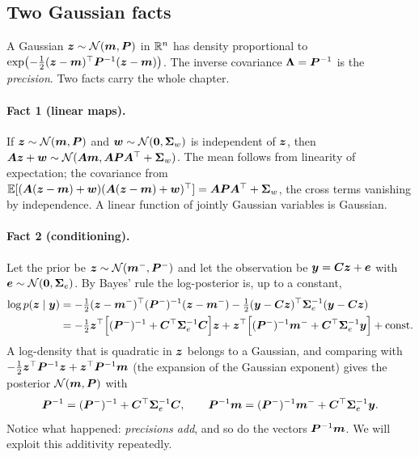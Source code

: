 \subsection{Two Gaussian facts}\label{sec:c08-gauss}

A Gaussian $\bm{z}\sim\mathcal{N}(\bm{m},\bm{P})$ in $\mathbb{R}^n$ has density proportional to
$\exp\bigl(-\tfrac12(\bm{z}-\bm{m})^{\top}\bm{P}^{-1}(\bm{z}-\bm{m})\bigr)$. The inverse covariance
$\bm{\Lambda}=\bm{P}^{-1}$ is the \emph{precision}. Two facts carry the whole chapter.

\paragraph{Fact 1 (linear maps).} If $\bm{z}\sim\mathcal{N}(\bm{m},\bm{P})$ and $\bm{w}\sim\mathcal{N}(\bm{0},
\bm{\Sigma}_w)$ is independent of $\bm{z}$, then $\bm{A}\bm{z}+\bm{w}\sim\mathcal{N}(\bm{A}\bm{m},\bm{A}\bm{P}\bm{A}^{\top}+\bm{\Sigma}_w)$.
The mean follows from linearity of expectation; the covariance from
$\mathbb{E}[(\bm{A}(\bm{z}-\bm{m})+\bm{w})(\bm{A}(\bm{z}-\bm{m})+\bm{w})^{\top}]=\bm{A}\bm{P}\bm{A}^{\top}+\bm{\Sigma}_w$, the cross terms vanishing by
independence. A linear function of jointly Gaussian variables is Gaussian.

\paragraph{Fact 2 (conditioning).} Let the prior be $\bm{z}\sim\mathcal{N}(\bm{m}^-,\bm{P}^-)$ and let the
observation be $\bm{y}=\bm{C}\bm{z}+\bm{e}$ with $\bm{e}\sim\mathcal{N}(\bm{0},\bm{\Sigma}_e)$. By Bayes' rule the
log-posterior is, up to a constant,
\begin{align*}
  \log p(\bm{z}\mid\bm{y}) &= -\tfrac12(\bm{z}-\bm{m}^-)^{\top}(\bm{P}^-)^{-1}(\bm{z}-\bm{m}^-)
                         -\tfrac12(\bm{y}-\bm{C}\bm{z})^{\top}\bm{\Sigma}_e^{-1}(\bm{y}-\bm{C}\bm{z}) \\
  &= -\tfrac12\bm{z}^{\top}\Bigl[(\bm{P}^-)^{-1}+\bm{C}^{\top}\bm{\Sigma}_e^{-1}\bm{C}\Bigr]\bm{z}
     + \bm{z}^{\top}\Bigl[(\bm{P}^-)^{-1}\bm{m}^-+\bm{C}^{\top}\bm{\Sigma}_e^{-1}\bm{y}\Bigr] + \text{const}.
\end{align*}
A log-density that is quadratic in $\bm{z}$ belongs to a Gaussian, and comparing with
$-\tfrac12\bm{z}^{\top}\bm{P}^{-1}\bm{z}+\bm{z}^{\top}\bm{P}^{-1}\bm{m}$ (the expansion of the Gaussian exponent) gives the
posterior $\mathcal{N}(\bm{m},\bm{P})$ with
\begin{equation}\label{eq:c08-cond-info}
  \bm{P}^{-1} = (\bm{P}^-)^{-1} + \bm{C}^{\top}\bm{\Sigma}_e^{-1}\bm{C}, \qquad
  \bm{P}^{-1}\bm{m} = (\bm{P}^-)^{-1}\bm{m}^- + \bm{C}^{\top}\bm{\Sigma}_e^{-1}\bm{y} .
\end{equation}
Notice what happened: \emph{precisions add}, and so do the vectors $\bm{P}^{-1}\bm{m}$. We will exploit
this additivity repeatedly.

